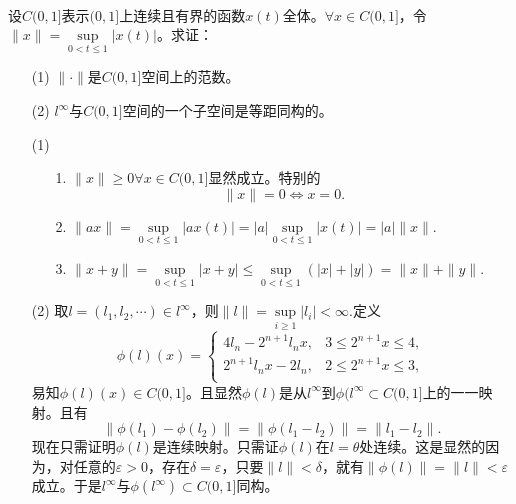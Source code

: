 \begin{exercise}
\hfill\\
设$C(0,1]$表示$(0,1]$上连续且有界的函数$x(t)$全体。$\forall x\in C(0,1]$，令$\|x\|=\sup\limits_{0<t\leq1}|x(t)|$。求证：
\begin{enumerate}
\item[(1)] $\|\cdot\|$是$C(0,1]$空间上的范数。
\item[(2)] $l^{\infty}$与$C(0,1]$空间的一个子空间是等距同构的。
\end{enumerate}

\begin{enumerate}
\item[(1)]
\begin{enumerate}
\item[1.]$\|x\|\geq0\forall x\in C(0,1]$显然成立。特别的
$$\|x\|=0\Leftrightarrow x=0.$$
\item[2.]$\|ax\|=\sup\limits_{0<t\leq1}|ax(t)|=|a|\sup\limits_{0<t\leq1}|x(t)|=|a|\|x\|.$
\item[3.]$\|x+y\|=\sup\limits_{0<t\leq1}|x+y|\leq\sup\limits_{0<t\leq1}(|x|+|y|)=\|x\|+\|y\|.$
\end{enumerate}
\item[(2)] 取$l=(l_1,l_2,\cdots)\in l^{\infty}$，则$\|l\|=\sup\limits_{i\geq1}|l_i|<\infty.$定义$$\phi(l)(x)=\begin{cases}
4l_n-2^{n+1}l_nx,&3\leq2^{n+1}x\leq4,\\
2^{n+1}l_nx-2l_n,&2\leq2^{n+1}x\leq3,\\
\end{cases}$$
易知$\phi(l)(x)\in C(0,1]$。且显然$\phi(l)$是从$l^{\infty}$到$\phi(l^{\infty}\subset C(0,1]$上的一一映射。且有$$\|\phi(l_1)-\phi(l_2)\|=\|\phi(l_1-l_2)\|=\|l_1-l_2\|.$$
现在只需证明$\phi(l)$是连续映射。只需证$\phi(l)$在$l=\theta$处连续。这是显然的因为，对任意的$\varepsilon>0$，存在$\delta=\varepsilon$，只要$\|l\|<\delta$，就有$\|\phi(l)\|=\|l\|<\varepsilon$成立。于是$l^{\infty}$与$\phi(l^{\infty})\subset C(0,1]$同构。
\end{enumerate}
\end{exercise}

